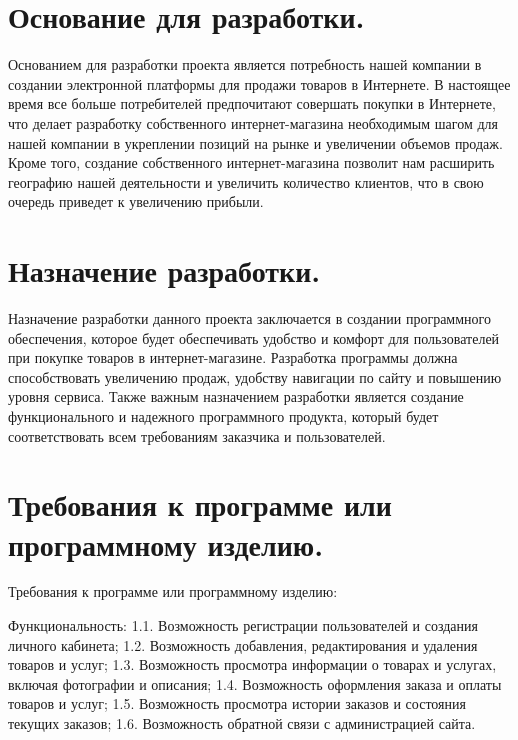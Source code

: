 \newpage
\section{Основание для разработки.}



Основанием для разработки проекта является потребность нашей компании в создании электронной платформы для продажи товаров в Интернете. В настоящее время все больше потребителей предпочитают совершать покупки в Интернете, что делает разработку собственного интернет-магазина необходимым шагом для нашей компании в укреплении позиций на рынке и увеличении объемов продаж. Кроме того, создание собственного интернет-магазина позволит нам расширить географию нашей деятельности и увеличить количество клиентов, что в свою очередь приведет к увеличению прибыли.








\newpage
\section{Назначение разработки.}



Назначение разработки данного проекта заключается в создании программного обеспечения, которое будет обеспечивать удобство и комфорт для пользователей при покупке товаров в интернет-магазине. Разработка программы должна способствовать увеличению продаж, удобству навигации по сайту и повышению уровня сервиса. Также важным назначением разработки является создание функционального и надежного программного продукта, который будет соответствовать всем требованиям заказчика и пользователей.







\newpage
\section{Требования к программе или программному изделию.}





Требования к программе или программному изделию:

    Функциональность:
    1.1. Возможность регистрации пользователей и создания личного кабинета;
    1.2. Возможность добавления, редактирования и удаления товаров и услуг;
    1.3. Возможность просмотра информации о товарах и услугах, включая фотографии и описания;
    1.4. Возможность оформления заказа и оплаты товаров и услуг;
    1.5. Возможность просмотра истории заказов и состояния текущих заказов;
    1.6. Возможность обратной связи с администрацией сайта.

